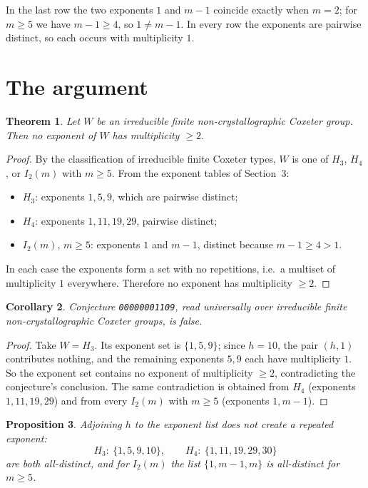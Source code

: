 \documentclass[11pt]{article}
\newtheorem{theorem}{Theorem}
\newtheorem{corollary}[theorem]{Corollary}
\newtheorem{proposition}[theorem]{Proposition}
\theoremstyle{definition}
\theoremstyle{remark}
\begin{document}
In the last row the two exponents $1$ and $m-1$ coincide exactly when
$m = 2$; for $m \ge 5$ we have $m - 1 \ge 4$, so $1 \ne m - 1$. In every row
the exponents are pairwise distinct, so each occurs with multiplicity $1$.

\section{The argument}

\begin{theorem}\label{thm:main}
Let $W$ be an irreducible finite non-crystallographic Coxeter group. Then no
exponent of $W$ has multiplicity $\ge 2$.
\end{theorem}

\begin{proof}
By the classification of irreducible finite Coxeter types, $W$ is one of
$H_3$, $H_4$, or $I_2(m)$ with $m \ge 5$. From the exponent tables of
Section~3:
\begin{itemize}
  \item $H_3$: exponents $1, 5, 9$, which are pairwise distinct;
  \item $H_4$: exponents $1, 11, 19, 29$, pairwise distinct;
  \item $I_2(m)$, $m \ge 5$: exponents $1$ and $m-1$, distinct because
        $m - 1 \ge 4 > 1$.
\end{itemize}
In each case the exponents form a set with no repetitions, i.e.\ a multiset of
multiplicity $1$ everywhere. Therefore no exponent has multiplicity $\ge 2$.
\end{proof}

\begin{corollary}\label{cor:false}
Conjecture \texttt{00000001109}, read universally over irreducible finite
non-crystallographic Coxeter groups, is false.
\end{corollary}

\begin{proof}
Take $W = H_3$. Its exponent set is $\{1,5,9\}$; since $h = 10$, the pair
$(h,1)$ contributes nothing, and the remaining exponents $5, 9$ each have
multiplicity $1$. So the exponent set contains no exponent of multiplicity
$\ge 2$, contradicting the conjecture's conclusion. The same contradiction is
obtained from $H_4$ (exponents $1,11,19,29$) and from every $I_2(m)$ with
$m \ge 5$ (exponents $1, m-1$).
\end{proof}

\begin{proposition}\label{prop:adjoinh}
Adjoining $h$ to the exponent list does not create a repeated exponent:
\[
H_3:\ \{1,5,9,10\}, \qquad H_4:\ \{1,11,19,29,30\}
\]
are both all-distinct, and for $I_2(m)$ the list $\{1, m-1, m\}$ is
all-distinct for $m \ge 5$.
\end{proposition}
\end{document}
